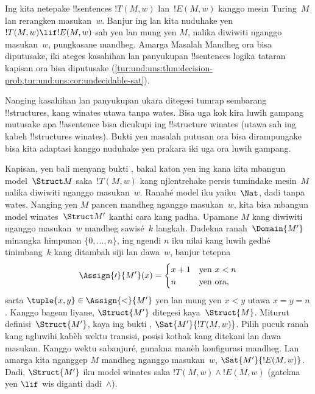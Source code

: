 \documentclass[../../../include/open-logic-section]{subfiles}
\begin{document}

\begin{explain}
  Ing  kita netepake !!{sentence}s
  $!T(M,w)$ lan~$!E(M,w)$ kanggo mesin Turing~$M$
  lan rerangken masukan~$w$. Banjur ing
   lan
   kita nuduhake yen
  $!T(M,w) \lif !E(M,w)$ sah yen lan mung yen $M$,
  nalika diwiwiti nganggo masukan~$w$, pungkasane mandheg.
  Amarga Masalah Mandheg ora bisa diputusake, iki
  ateges kasahihan lan panyukupan !!{sentence}s
  logika tataran kapisan ora bisa diputusake
  (\cref{tur:und:uns:thm:decision-prob,tur:und:uns:cor:undecidable-sat}).

  Nanging kasahihan lan panyukupan ukara ditegesi
  tumrap sembarang !!{structure}s, kang winates utawa
  tanpa wates. Bisa uga kok kira luwih gampang
  mutusake apa !!a{sentence} bisa dicukupi ing
  !!{structure} winates (utawa sah ing kabeh
  !!{structure}s winates). Bukti yen masalah putusan
  ora bisa dirampungake bisa kita adaptasi kanggo
  nuduhake yen prakara iki uga ora luwih gampang.

  Kapisan, yen bali menyang bukti
  , bakal katon yen ing kana
  kita mbangun model~$\Struct M$ saka~$!T(M,w)$ kang
  njlentrehake persis tumindake mesin~$M$ nalika
  diwiwiti nganggo masukan~$w$. Ranahé model iku
  yaiku~$\Nat$, dadi tanpa wates. Nanging yen $M$
  pancen mandheg nganggo masukan~$w$, kita bisa
  mbangun model winates~$\Struct M'$ kanthi cara
  kang padha. Upamane $M$ kang diwiwiti nganggo
  masukan~$w$ mandheg sawisé~$k$ langkah. Dadekna
  ranah~$\Domain{M'}$ minangka himpunan
  $\{0, \dots, n\}$, ing ngendi $n$ iku nilai
  kang luwih gedhé tinimbang~$k$ kang ditambah siji lan dawa~$w$,
  banjur tetepna
  \[
    \Assign{\prime}{M'}(x) = 
    \begin{cases}
      x + 1 &\text{yen $x < n$}\\
      n &\text{yen ora,}
    \end{cases}
  \]
  sarta $\tuple{x,y} \in \Assign{<}{M'}$ yen lan
  mung yen $x < y$ utawa $x = y = n$. Kanggo
  bagean liyane, $\Struct{M'}$ ditegesi kaya~$\Struct{M}$.
  Miturut definisi~$\Struct{M'}$, kaya ing bukti
  , $\Sat{M'}{!T(M,w)}$. Pilih pucuk ranah kang ngluwihi kabèh wektu transisi, posisi kothak kang ditekani lan dawa masukan. Kanggo wektu sabanjuré, gunakna manèh konfigurasi mandheg.
  Lan amarga kita nganggep $M$ mandheg nganggo
  masukan~$w$, $\Sat{M'}{!E(M,w)}$. Dadi,
  $\Struct{M'}$ iku model winates saka
  $!T(M,w) \land !E(M,w)$ (gatekna yen $\lif$
  wis diganti dadi~$\land$).
  

\end{explain}
\end{document}
